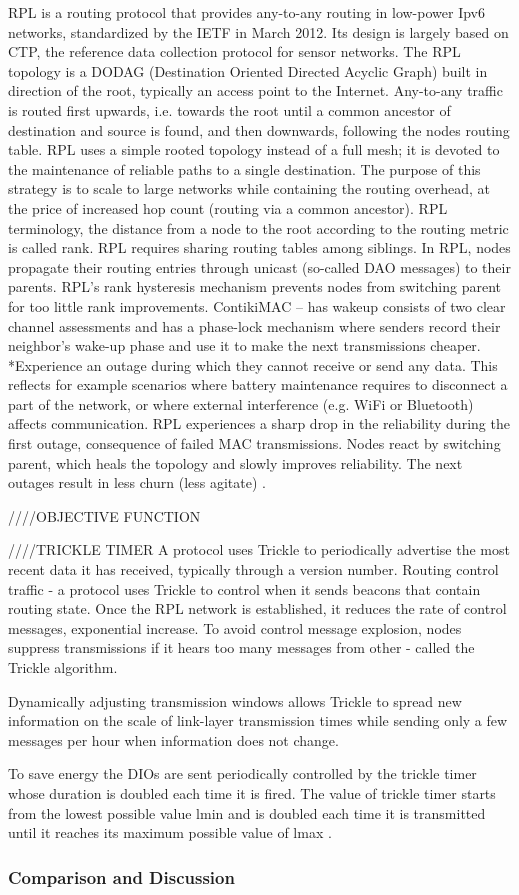 RPL is a routing protocol that provides any-to-any routing in low-power Ipv6 networks, standardized by the IETF in March 2012. Its design is largely based on CTP, the reference data collection protocol for sensor networks. The RPL topology is a DODAG (Destination Oriented Directed Acyclic Graph) built in direction of the root, typically an access point to the Internet. Any-to-any traffic is routed first upwards, i.e. towards the root until a common ancestor of destination and source is found, and then downwards, following the nodes routing table. RPL uses a simple rooted topology instead of a full mesh; it is devoted to the maintenance of reliable paths to a single destination. The purpose of this strategy is to scale to large networks while containing the routing overhead, at the price of increased hop count (routing via a common ancestor). RPL terminology, the distance from a node to the root according to the routing metric is called rank. RPL requires sharing routing tables among siblings. In RPL, nodes propagate their routing entries through unicast (so-called DAO messages) to their parents. RPL’s rank hysteresis mechanism prevents nodes from switching parent for too little rank improvements. ContikiMAC – has wakeup consists of two clear channel assessments and has a phase-lock mechanism where senders record their neighbor’s wake-up phase and use it to make the next transmissions cheaper. *Experience an outage during which they cannot receive or send any data. This reflects for example scenarios where battery maintenance requires to disconnect a part of the network, or where external interference (e.g. WiFi or Bluetooth) affects communication. RPL experiences a sharp drop in the reliability during the first outage, consequence of failed MAC transmissions. Nodes react by switching parent, which heals the topology and slowly improves reliability. The next outages result in less churn (less agitate) \cite{orpl}.

////OBJECTIVE FUNCTION

////TRICKLE TIMER
A protocol uses Trickle to periodically advertise the most recent data it has received, typically through a version number. Routing control traffic - a protocol uses Trickle to control when it sends beacons that contain routing state.
Once the RPL network is established, it reduces the rate of control messages, exponential increase. To avoid control message explosion, nodes suppress transmissions if it hears too many messages from other - called the Trickle algorithm. 

Dynamically adjusting transmission windows allows Trickle to spread new information on the scale of link-layer transmission times while sending only a few messages per hour when information does not change.

To save energy the DIOs are sent periodically controlled by the trickle timer whose duration is doubled each time it is fired. The value of trickle timer starts from the lowest possible value lmin and is doubled each time it is transmitted until it reaches its maximum possible value of lmax \cite{trickle}.

\subsubsection{Comparison and Discussion}
